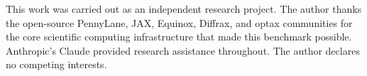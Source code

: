 \documentclass[%
  prx,
  twocolumn,
  amsmath,
  amssymb,
  aps,
  reprint,
  superscriptaddress,
  floatfix,
]{revtex4-2}
\begin{document}









\begin{acknowledgments}
This work was carried out as an independent research project. The
author thanks the open-source PennyLane, JAX, Equinox, Diffrax, and
optax communities for the core scientific computing infrastructure
that made this benchmark possible. Anthropic's Claude provided
research assistance throughout. The author declares no competing
interests.
\end{acknowledgments}



\end{document}
